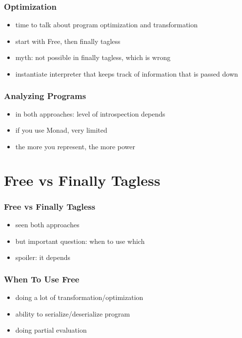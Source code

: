 \documentclass[aspectratio=169]{beamer}
\begin{document}
\begin{frame}
  \frametitle{Optimization}
  \begin{itemize}
  \item time to talk about program optimization and transformation
  \item start with Free, then finally tagless
  \item myth: not possible in finally tagless, which is wrong
  \item instantiate interpreter that keeps track of information that is passed down
  \end{itemize}
\end{frame}

\begin{frame}
  \frametitle{Analyzing Programs}
  \begin{itemize}
  \item in both approaches: level of introspection depends
  \item if you use Monad, very limited
  \item the more you represent, the more power
  \end{itemize}
\end{frame}

\section{Free vs Finally Tagless}\label{sec:free-vs-tagless}

\begin{frame}
  \frametitle{Free vs Finally Tagless}
  \begin{itemize}
  \item seen both approaches
  \item but important question: when to use which
  \item spoiler: it depends
  \end{itemize}
\end{frame}

\begin{frame}
  \frametitle{When To Use Free}
  \begin{itemize}
  \item doing a lot of transformation/optimization
  \item ability to serialize/deserialize program
  \item doing partial evaluation
  \end{itemize}
\end{frame}
\end{document}
